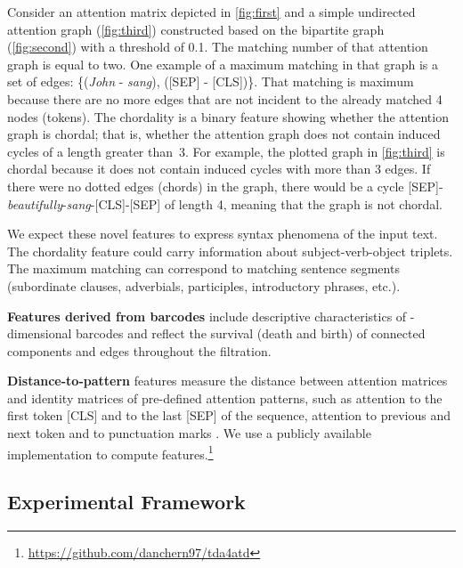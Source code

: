 \documentclass[11pt]{article}
\begin{document}
Consider an attention matrix depicted in \autoref{fig:first} and a simple undirected attention graph (\autoref{fig:third}) constructed based on the bipartite graph (\autoref{fig:second}) with a threshold of 0.1.
The matching number of that attention graph is equal to two.
One example of a maximum matching in that graph is a set of edges: \{(\textit{John} - \textit{sang}), (\textsc{[SEP]} - \textsc{[CLS]})\}. 
That matching is maximum because there are no more edges that are not incident to the already matched 4 nodes (tokens).
The chordality is a binary feature showing whether the attention graph is chordal; that is, whether the attention graph does not contain induced cycles of a length greater than~3.
For example, the plotted graph in \autoref{fig:third} is chordal because it does not contain induced cycles with more than 3 edges. 
If there were no dotted edges (chords) in the graph, there would be a cycle \textsc{[SEP]}-\textit{beautifully}-\textit{sang}-\textsc{[CLS]}-\textsc{[SEP]} of length 4, meaning that the graph is not chordal. 

We expect these novel features to express syntax phenomena of the input text. 
The chordality feature could carry information about subject-verb-object triplets. The maximum matching can correspond to matching sentence segments (subordinate clauses, adverbials, participles, introductory phrases, etc.). 

\textbf{Features derived from barcodes} include descriptive characteristics of -dimensional barcodes and reflect the survival (death and birth) of connected components and edges throughout the filtration. 

\textbf{Distance-to-pattern} features measure the distance between attention matrices and identity matrices of pre-defined attention patterns, such as attention to the first token \textsc{[CLS]} and to the last \textsc{[SEP]} of the sequence, attention to previous and next token and to punctuation marks \cite{clark-etal-2019-bert}.
We use a publicly available implementation to compute features.\footnote {\href{https://github.com/danchern97/tda4atd}{https://github.com/danchern97/tda4atd}}

\subsection{Experimental Framework}
\end{document}
